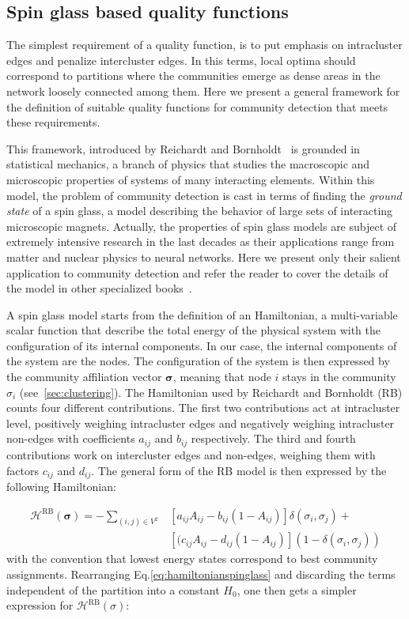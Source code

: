 \subsection{Spin glass based quality functions}
The simplest requirement of a quality function, is to put emphasis on intracluster edges and penalize intercluster edges. In this terms, local optima should correspond to partitions where the communities emerge as dense areas in the network loosely connected among them.
Here we present a general framework for the definition of suitable quality functions for community detection that meets these requirements.

This framework, introduced by Reichardt and Bornholdt~\cite{reichardt2006} is grounded in statistical mechanics, a branch of physics that studies the macroscopic and microscopic properties of systems of many interacting elements. Within this model, the problem of community detection is cast in terms of finding the \emph{ground state} of a spin glass, a model describing the behavior of large sets of interacting microscopic magnets.
Actually, the properties of spin glass models are subject of extremely intensive research in the last decades as their applications range from matter and nuclear physics to neural networks. Here we present only their salient application to community detection and refer the reader to cover the details of the model in other specialized books~\cite{Mezard1990}.

A spin glass model starts from the definition of an Hamiltonian, a multi-variable scalar function that describe the total energy of the physical system with the configuration of its internal components. In our case, the internal components of the system are the nodes. The configuration of the system is then expressed by the community affiliation vector $\boldsymbol\sigma$, meaning that node $i$ stays in the community $\sigma_i$ (see~\ref{sec:clustering}).
The Hamiltonian used by Reichardt and Bornholdt (RB) counts four different contributions. The first two contributions act at intracluster level, positively weighing intracluster edges and negatively weighing intracluster non-edges with coefficients $a_{ij}$ and $b_{ij}$ respectively. The third and fourth contributions work on intercluster edges and non-edges, weighing them with factors $c_{ij}$ and $d_{ij}$. The general form of the RB model is then expressed by the following Hamiltonian:

\begin{align}\label{eq:hamiltonianspinglass}
\mathcal{H}^{\textrm{RB}}(\boldsymbol \sigma) = - \sum_{(i,j)\in V^2} & \left[ a_{ij} A_{ij} - b_{ij}(1-A_{ij}) \right] \delta(\sigma_i,\sigma_j) + \nonumber \\ &  \left[ (c_{ij} A_{ij} - d_{ij}(1-A_{ij}) \right] (1-\delta(\sigma_i,\sigma_j))
\end{align}
with the convention that lowest energy states correspond to best community assignments.
Rearranging Eq.\ref{eq:hamiltonianspinglass} and discarding the terms independent of the partition into a constant $H_0$, one then gets a simpler expression for $\mathcal{H}^{\textrm{RB}}(\sigma)$:

